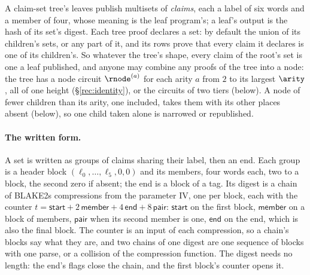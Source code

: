 A claim-set tree's leaves publish multisets of \emph{claims}, each a label of six words and a member of four, whose meaning is the leaf program's; a leaf's output is the hash of its set's digest. Each tree proof declares a set: by default the union of its children's sets, or any part of it, and its rows prove that every claim it declares is one of its children's. So whatever the tree's shape, every claim of the root's set is one a leaf published, and anyone may combine any proofs of the tree into a node: the tree has a node circuit $\rnode^{(a)}$ for each arity $a$ from $2$ to its largest $\arity$, all of one height (\S\ref{rec:identity}), or the circuits of two tiers (below). A node of fewer children than its arity, one included, takes them with its other places absent (below), so one child taken alone is narrowed or republished.

\paragraph{The written form.} A set is written as groups of claims sharing their label, then an end. Each group is a header block $(\ell_0,\dots,\ell_5,0,0)$ and its members, four words each, two to a block, the second zero if absent; the end is a block of a tag. Its digest is a chain of BLAKE2s compressions from the parameter IV, one per block, each with the counter $t=\mathsf{start}+2\,\mathsf{member}+4\,\mathsf{end}+8\,\mathsf{pair}$: $\mathsf{start}$ on the first block, $\mathsf{member}$ on a block of members, $\mathsf{pair}$ when its second member is one, $\mathsf{end}$ on the end, which is also the final block. The counter is an input of each compression, so a chain's blocks say what they are, and two chains of one digest are one sequence of blocks with one parse, or a collision of the compression function. The digest needs no length: the end's flags close the chain, and the first block's counter opens it.


